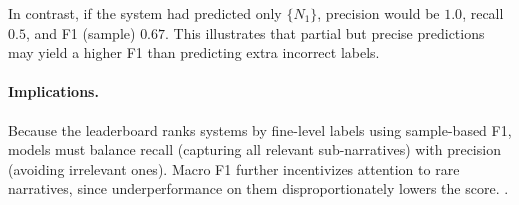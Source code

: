 In contrast, if the system had predicted only $\{N_{1}\}$,
precision would be $1.0$, recall $0.5$, and F1 (sample) $0.67$.
This illustrates that partial but precise predictions may yield a higher F1
than predicting extra incorrect labels.

\paragraph{Implications.}
Because the leaderboard ranks systems by fine-level labels using sample-based
F1, models must balance recall (capturing all relevant sub-narratives) with
precision (avoiding irrelevant ones). Macro F1 further incentivizes attention
to rare narratives, since underperformance on them disproportionately lowers
the score. \cite{Piskorski2025}.
